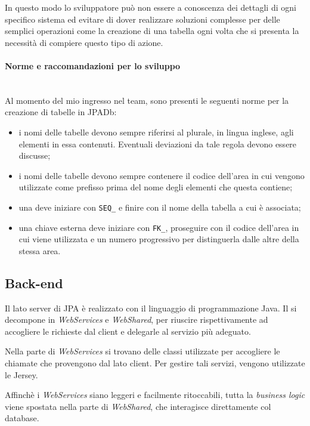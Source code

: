 In questo modo lo sviluppatore può non essere a conoscenza dei dettagli di ogni
specifico sistema ed evitare di dover realizzare soluzioni complesse per delle
semplici operazioni come la creazione di una tabella ogni volta che si presenta
la necessità di compiere questo tipo di azione.

\paragraph{Norme e raccomandazioni per lo sviluppo} \mbox{} \\

Al momento del mio ingresso nel team, sono presenti le seguenti norme per la
creazione di tabelle in JPADb:

\begin{itemize}
	\item i nomi delle tabelle devono sempre riferirsi al plurale, in lingua
	inglese, agli elementi in essa contenuti. Eventuali deviazioni da tale regola
	devono essere discusse;
	\item i nomi delle tabelle devono sempre contenere il codice dell'area in cui
	vengono utilizzate come prefisso prima del nome degli elementi che questa
	contiene;
	\item una  deve iniziare con \texttt{SEQ\_} e finire
	con il nome della tabella a cui è associata;
	\item una chiave esterna deve iniziare con \texttt{FK\_}, proseguire con il
	codice dell'area in cui viene utilizzata e un numero progressivo per
	distinguerla dalle altre della stessa area.
\end{itemize}

\subsection{Back-end}

Il lato server di JPA è realizzato con il linguaggio di programmazione Java.
Il \BKEND{} si decompone in \emph{WebServices} e \emph{WebShared}, per riuscire
rispettivamente ad accogliere le richieste dal client e delegarle al servizio
più adeguato.

Nella parte di \emph{WebServices} si trovano delle classi utilizzate per
accogliere le chiamate  che provengono dal lato client. Per gestire
tali servizi, vengono utilizzate le  Jersey.

Affinchè i \emph{WebServices} siano leggeri e facilmente ritoccabili, tutta la
\emph{business logic} viene spostata nella parte di \emph{WebShared}, che
interagisce direttamente col database.

